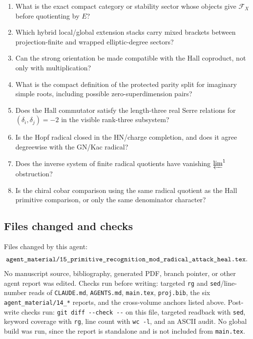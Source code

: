 \begin{enumerate}
\item What is the exact compact category or stability sector whose
objects give \(\mathcal F_X\) before quotienting by \(E\)?
\item Which hybrid local/global extension stacks carry mixed brackets
between projection-finite and wrapped elliptic-degree sectors?
\item Can the strong orientation be made compatible with the Hall
coproduct, not only with multiplication?
\item What is the compact definition of the protected parity split for
imaginary simple roots, including possible zero-superdimension pairs?
\item Does the Hall commutator satisfy the length-three real Serre
relations for \((\delta_i,\delta_j)=-2\) in the visible rank-three
subsystem?
\item Is the Hopf radical closed in the HN/charge completion, and does
it agree degreewise with the GN/Kac radical?
\item Does the inverse system of finite radical quotients have vanishing
\(\varprojlim^1\) obstruction?
\item Is the chiral cobar comparison using the same radical quotient as
the Hall primitive comparison, or only the same denominator character?
\end{enumerate}

\subsection{Files changed and checks}

Files changed by this agent:
\[
\verb|agent_material/15_primitive_recognition_mod_radical_attack_heal.tex|.
\]
No manuscript source, bibliography, generated PDF, branch pointer, or
other agent report was edited.  Checks run before writing: targeted
\verb|rg| and \verb|sed|/line-number reads of \verb|CLAUDE.md|,
\verb|AGENTS.md|, \verb|main.tex|, \verb|proj.bib|, the six
\verb|agent_material/14_*| reports, and the cross-volume anchors listed
above.  Post-write checks run: \verb|git diff --check --| on this file,
targeted readback with \verb|sed|, keyword coverage with \verb|rg|, line
count with \verb|wc -l|, and an ASCII audit.  No global build was run,
since the report is standalone and is not included from \verb|main.tex|.
